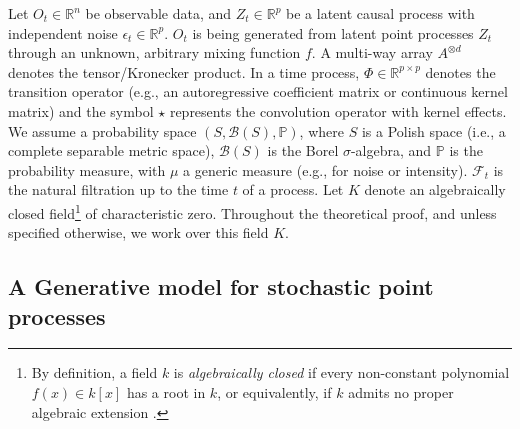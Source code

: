 \documentclass[10pt]{article}
\numberwithin{figure}{section}
\begin{document}
Let $O_t\in \mathbb{R}^n$ be observable data, and $Z_t \in \mathbb{R}^p$ be a latent causal process with independent noise $\epsilon_t \in \mathbb{R}^p$. $O_t$ is being generated from latent point processes $Z_t$ through an unknown, arbitrary mixing function $f$.  A multi-way array $A^{\otimes d}$ denotes the tensor/Kronecker product.  In a time process,  $\Phi \in \mathbb{R}^{p \times p}$ denotes the transition operator (e.g., an autoregressive coefficient matrix or continuous kernel matrix) and the symbol $\star$  represents the convolution operator with kernel effects. We assume a probability space $(S, \mathcal{B}(S), \mathbb{P})$, where $S$ is a Polish space (i.e., a complete separable metric space), $\mathcal{B}(S)$ is the Borel $\sigma$-algebra, and $\mathbb{P}$ is the probability measure, with $\mu$  a generic measure (e.g., for noise or intensity). $\mathcal{F}_t$ is the natural filtration up to the time $t$ of a process. Let $K$ denote an algebraically closed field\footnote{By definition, a field $k$ is \emph{algebraically closed} if every 
non-constant polynomial $f(x) \in k[x]$ has a root in $k$, or equivalently, 
if $k$ admits no proper algebraic extension 
\citep[see][Ch.v]{Lang2002, AtiyahMacdonald1969}.} of characteristic zero. Throughout the theoretical proof, and unless specified otherwise, we work over this field $K$. 

\subsection{A Generative model for stochastic point processes}
\end{document}
